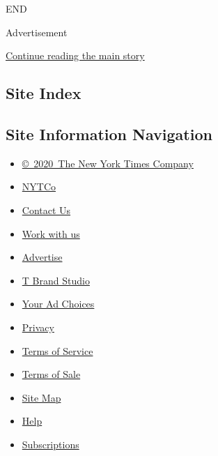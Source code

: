 END

Advertisement

\protect\hyperlink{after-bottom}{Continue reading the main story}

\hypertarget{site-index}{%
\subsection{Site Index}\label{site-index}}

\hypertarget{site-information-navigation}{%
\subsection{Site Information
Navigation}\label{site-information-navigation}}

\begin{itemize}
\tightlist
\item
  \href{https://help.nytimes.com/hc/en-us/articles/115014792127-Copyright-notice}{©~2020~The
  New York Times Company}
\end{itemize}

\begin{itemize}
\tightlist
\item
  \href{https://www.nytco.com/}{NYTCo}
\item
  \href{https://help.nytimes.com/hc/en-us/articles/115015385887-Contact-Us}{Contact
  Us}
\item
  \href{https://www.nytco.com/careers/}{Work with us}
\item
  \href{https://nytmediakit.com/}{Advertise}
\item
  \href{http://www.tbrandstudio.com/}{T Brand Studio}
\item
  \href{https://www.nytimes.com/privacy/cookie-policy\#how-do-i-manage-trackers}{Your
  Ad Choices}
\item
  \href{https://www.nytimes.com/privacy}{Privacy}
\item
  \href{https://help.nytimes.com/hc/en-us/articles/115014893428-Terms-of-service}{Terms
  of Service}
\item
  \href{https://help.nytimes.com/hc/en-us/articles/115014893968-Terms-of-sale}{Terms
  of Sale}
\item
  \href{https://spiderbites.nytimes.com}{Site Map}
\item
  \href{https://help.nytimes.com/hc/en-us}{Help}
\item
  \href{https://www.nytimes.com/subscription?campaignId=37WXW}{Subscriptions}
\end{itemize}
